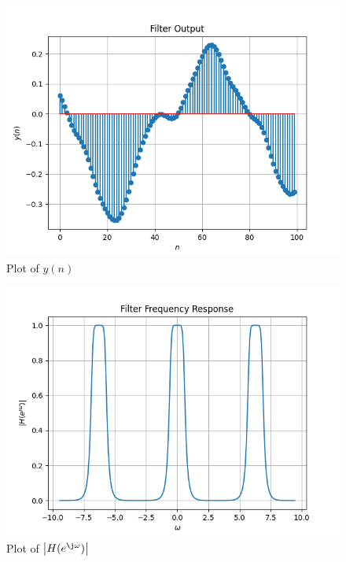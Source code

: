 \documentclass[journal,12pt,twocolumn]{IEEEtran}
\renewcommand\thesection{\arabic{section}}
\begin{document}
\begin{enumerate}[label=\thesection.\arabic*]
	\begin{figure}[!ht]
		\centering
		\includegraphics[width=\columnwidth]{./figs/7.2.1.png}
		\caption{Plot of $y(n)$}
		\label{fig-7.2.1}	
	\end{figure}
	
	\begin{figure}[!ht]
		\centering
		\includegraphics[width=\columnwidth]{./figs/7.2.2.png}
		\caption{Plot of $\abs{H(e^{\j\omega})}$}
		\label{fig-7.2.2}	
	\end{figure}
	

\end{enumerate}
\end{document}
